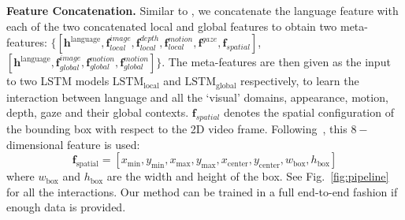 \documentclass[10pt,twocolumn,letterpaper]{article}
\newcommand{\model}[2]{$\text{#1}_{\text{#2}}$}
\newcommand{\vect}[1]{{\mathbf #1}}
\begin{document}
\noindent \textbf{Feature Concatenation.}
Similar to \cite{hu2016natural}, we concatenate the language feature with each of the two concatenated local and global features to obtain two meta-features: $\{[\vect{h}^{\text{language}}, \vect{f}_{local}^{image}, \vect{f}_{local}^{depth}, \vect{f}_{local}^{motion}, \vect{f}^{gaze},\vect{f}_{spatial}]$, $[\vect{h}^{\text{language}}, \vect{f}_{global}^{image}, \vect{f}_{global}^{motion}, \vect{f}_{global}^{motion}]\}$. The meta-features are then given as the input to two LSTM models \model{LSTM}{local} and \model{LSTM}{global} respectively, to learn the interaction between language and all the `visual' domains, \ie appearance, motion, depth, gaze and their global contexts.  
$\vect{f}_{spatial}$ denotes the spatial configuration of the bounding box  with respect to the 2D video frame. Following~\cite{mao2016generation,hu2016natural}, this $8-$dimensional feature is used:  
\begin{equation}
\vect{f}_{\text{spatial}}=[x_{\text{min}}, y_{\text{min}}, x_{\text{max}}, y_{\text{max}}, x_{\text{center}}, y_{\text{center}}, w_{\text{box}}, h_{\text{box}}]
\end{equation}
where $w_{\text{box}}$ and $h_{\text{box}}$ are the width and height of the box. 
See Fig.~\ref{fig:pipeline} for all the interactions. Our method can be trained in a full end-to-end fashion if enough data is provided.  
\end{document}
